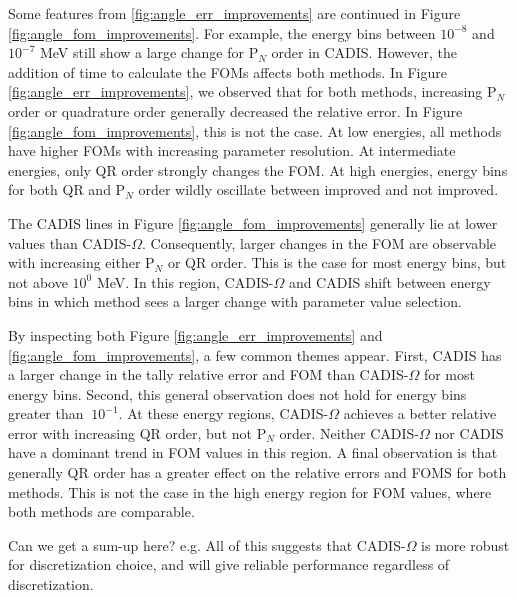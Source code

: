 Some features from \ref{fig:angle_err_improvements} are continued in Figure
\ref{fig:angle_fom_improvements}. For example, the energy bins between $10^{-8}$
and $10^{-7}$ MeV still show a large change for P$_N$ order in CADIS. However,
the addition of time to calculate the FOMs affects both methods. In Figure
\ref{fig:angle_err_improvements}, we observed that for both methods, increasing
P$_N$ order or quadrature order generally decreased the relative error. In
Figure \ref{fig:angle_fom_improvements}, this is not the case. At low energies,
all methods have higher FOMs with increasing parameter resolution. At
intermediate energies, only QR order strongly changes the FOM. At high
energies, energy bins for both QR and P$_N$ order wildly oscillate between
improved and not improved.

The CADIS lines in Figure \ref{fig:angle_fom_improvements} generally lie at
lower values than CADIS-$\Omega$. Consequently, larger changes in the FOM are
observable with increasing either P$_N$ or QR order. This is the case for
most energy bins, but not above $10^0$ MeV. In this region, CADIS-$\Omega$ and
CADIS shift between energy bins in which method sees
a larger change with parameter value selection.

By inspecting both Figure \ref{fig:angle_err_improvements} and
\ref{fig:angle_fom_improvements}, a few common themes appear. First, CADIS has a
larger change in the tally relative error and FOM than CADIS-$\Omega$ for most
energy bins.
Second, this general observation does not hold for energy bins
greater than $~10^{-1}$. At these energy regions, CADIS-$\Omega$ achieves a
better relative error with increasing QR order, but not P$_N$ order. Neither
CADIS-$\Omega$ nor CADIS have a dominant trend in FOM values in this region.
A final observation is that generally QR order has a greater effect on the
relative errors and FOMS for both methods. This is not the case in the high
energy region for FOM values, where both methods are comparable.

Can we get a sum-up here? e.g. All of this suggests that CADIS-$\Omega$ is more robust for discretization choice,
and will give reliable performance regardless of discretization. 

